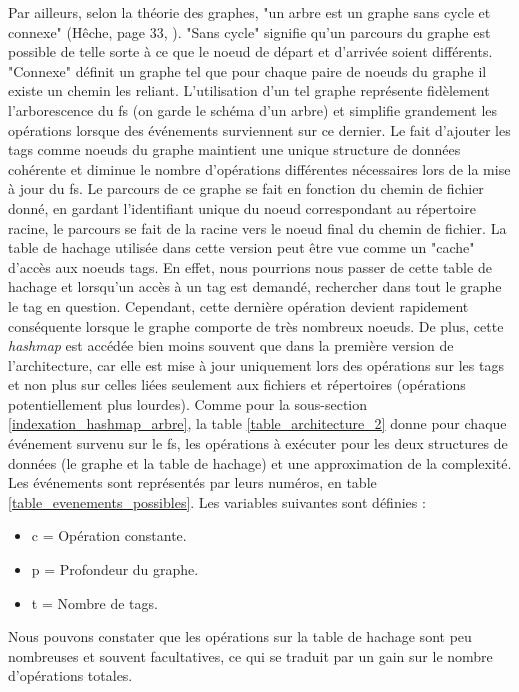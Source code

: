Par ailleurs, selon la théorie des graphes, "un arbre est un graphe sans cycle et connexe" (Hêche, 
page 33, \cite{ref28}). "Sans cycle" signifie qu'un parcours du graphe est possible de telle sorte 
à ce que le noeud de départ et d'arrivée soient différents. "Connexe" définit un graphe tel que 
pour chaque paire de noeuds du graphe il existe un chemin les reliant. L'utilisation d'un tel 
graphe représente fidèlement l'arborescence du \acrshort{fs} (on garde le schéma d'un arbre) 
et simplifie grandement les opérations lorsque des événements surviennent sur ce dernier. 
Le fait d'ajouter les tags comme noeuds du graphe 
maintient une unique structure de données cohérente et diminue le nombre d'opérations différentes 
nécessaires lors de la mise à jour du \acrshort{fs}. Le parcours de ce graphe se fait en 
fonction du chemin de fichier donné, en gardant l'identifiant unique du noeud correspondant au 
répertoire racine, le parcours se fait de la racine vers le noeud final du chemin de fichier.
\newpage
La table de hachage utilisée dans cette version peut être vue comme un "cache" d'accès aux noeuds 
tags. En effet, nous pourrions nous passer de cette table de hachage et lorsqu'un accès à un tag 
est demandé, rechercher dans tout le graphe le tag en question. Cependant, cette dernière opération 
devient rapidement conséquente lorsque le graphe comporte de très nombreux noeuds. De plus, cette 
\textit{hashmap} est accédée bien moins souvent que dans la première version de l'architecture, 
car elle est mise à jour uniquement lors des opérations sur les tags et non plus sur celles liées 
seulement aux fichiers et répertoires (opérations potentiellement plus lourdes).
\bigbreak
Comme pour la sous-section \ref{indexation_hashmap_arbre}, la table \ref{table_architecture_2} 
donne pour chaque événement survenu sur le \acrshort{fs}, les opérations 
à exécuter pour les deux structures de données (le graphe et la table de hachage) et une approximation 
de la complexité. Les événements sont représentés par leurs numéros, en table 
\ref{table_evenements_possibles}. Les variables suivantes sont définies :
\begin{itemize}
    \item c = Opération constante.
    \item p = Profondeur du graphe.
    \item t = Nombre de tags.
\end{itemize}
Nous pouvons constater que les opérations sur la table de hachage sont peu nombreuses et souvent 
facultatives, ce qui se traduit par un gain sur le nombre d'opérations totales.
